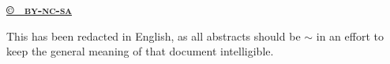 \foreignlanguage{english}{\href{https://creativecommons.org/licenses/by-nc-sa/4.0/}{\textbf{©~ \textsc{by-nc-sa}}}}\par\foreignlanguage{english}{This has been redacted in English, as all abstracts should be $\sim$ in an effort to keep the general meaning of that document intelligible.}